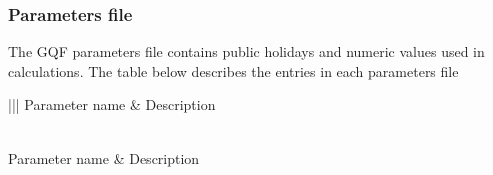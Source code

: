 \documentclass[letterpaper,10pt,english]{sphinxmanual}
\begin{document}
\subsubsection{Parameters file}
\label{\detokenize{OtherManuals/GQF_Manual:parameters-file}}\label{\detokenize{OtherManuals/GQF_Manual:id3}}
The GQF parameters file contains public holidays and numeric values used
in calculations. The table below describes the entries in each
parameters file


\begin{savenotes}\sphinxatlongtablestart\begin{longtable}{|||}
\hline
\sphinxstyletheadfamily 
Parameter name
&\sphinxstyletheadfamily 
Description
\\
\hline
\endfirsthead

%
{}\\
\hline
\sphinxstyletheadfamily 
Parameter name
&\sphinxstyletheadfamily 
Description
\\
\hline
\endhead

\hline
{}\\
\endfoot

\endlastfoot


\end{longtable}
\end{savenotes}
\end{document}

